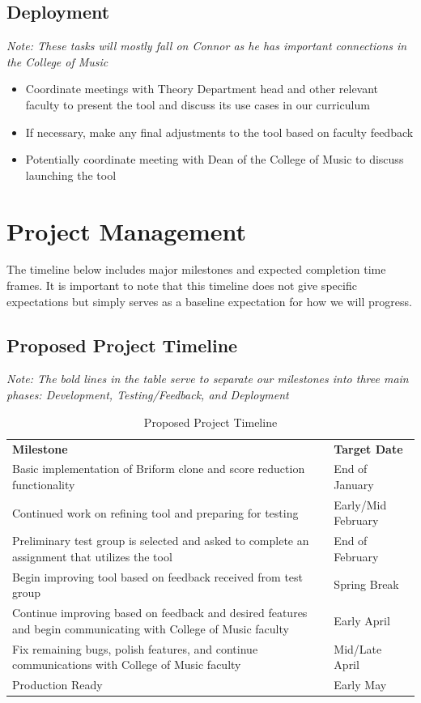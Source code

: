 \documentclass[12pt, letterpaper]{article}
\begin{document}
\subsection*{Deployment}
\textit{Note: These tasks will mostly fall on Connor as he has important connections in the College of Music}
\begin{itemize}
    \item[--] Coordinate meetings with Theory Department head and other relevant faculty to present the tool and discuss its use cases in our curriculum
    \item[--] If necessary, make any final adjustments to the tool based on faculty feedback
    \item[--] Potentially coordinate meeting with Dean of the College of Music to discuss launching the tool
\end{itemize}

\section*{Project Management}
The timeline below includes major milestones and expected completion time frames.  It is important to note that this timeline does not give specific expectations but simply serves as a baseline expectation for how we will progress.

\subsection*{Proposed Project Timeline}
\textit{Note: The bold lines in the table serve to separate our milestones into three main phases: Development, Testing/Feedback, and Deployment}
\begin{table}[h!]
\caption{Proposed Project Timeline}
\centering
\begin{tabular}{|p{8cm}|p{4cm}|}
\hline
\textbf{Milestone} & \textbf{Target Date} \\
\Xhline{4\arrayrulewidth}
Basic implementation of Briform clone and score reduction functionality & End of January \\
\hline
Continued work on refining tool and preparing for testing & Early/Mid February \\
\Xhline{4\arrayrulewidth}
Preliminary test group is selected and asked to complete an assignment that utilizes the tool & End of February \\
\hline
Begin improving tool based on feedback received from test group & Spring Break \\
\Xhline{4\arrayrulewidth}
Continue improving based on feedback and desired features and begin communicating with College of Music faculty & Early April \\
\hline
Fix remaining bugs, polish features, and continue communications with College of Music faculty & Mid/Late April \\
\hline
Production Ready & Early May \\
\hline
\end{tabular}
\end{table}
\end{document}

